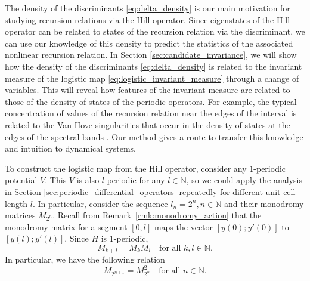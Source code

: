\documentclass[a4paper]{article}
\theoremstyle{definition}
\numberwithin{equation}{section}
\numberwithin{theorem}{section}
\begin{document}
{The density of the discriminants \eqref{eq:delta_density} is our main motivation for studying recursion relations via the Hill operator. Since eigenstates of the Hill operator can be related to states of the recursion relation via the discriminant, we can use our knowledge of this density to predict the statistics of the associated nonlinear recursion relation. In Section \ref{sec:candidate_invariance}, we will show how the density of the discriminants \eqref{eq:delta_density} is  related to the invariant measure of the logistic map \eqref{eq:logistic_invariant_measure} through a change of variables. This will reveal how features of the invariant measure are related to those of the density of states of the periodic operators.  For example, the typical concentration of values of the recursion relation near the edges of the interval is related to the Van Hove singularities that occur in the density of states at the edges of the spectral bands \cite{davies2024vanhove, van1953occurrence}. Our method gives a route to transfer this knowledge and intuition to dynamical systems.

To construct the logistic map from the Hill operator, consider any $1$-periodic potential $V$. This $V$ is also $l$-periodic for any $l\in\mathbb{N}$, so we could apply the analysis in Section \ref{sec:periodic_differential_operators} repeatedly for different unit cell length $l$. In particular, consider the sequence $l_n=2^n, n\in\mathbb{N}$ and their monodromy matrices $M_{2^n}$. Recall from Remark~\ref{rmk:monodromy_action} that the monodromy matrix for a segment $[0,l]$ maps the vector $[y(0);y'(0)]$ to $[y(l);y'(l)]$. Since $H$ is 1-periodic,
\begin{equation} \label{eq:monodromy_periodicity}
    M_{k+l}=M_kM_l\quad\text{for all $k,l\in\mathbb{N}$.}
\end{equation}
In particular, we have the following relation
\begin{equation*}
    M_{2^{n+1}} = M_{2^n}^2\quad\text{for all $n\in\mathbb{N}$}.
\end{equation*}

}
\end{document}
